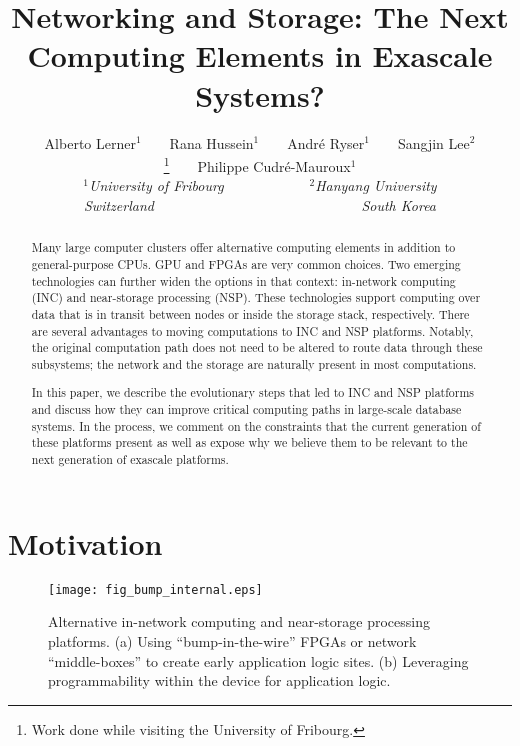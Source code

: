 \documentclass[11pt,dvipdfmx]{article}
\begin{document}
\title{Networking and Storage: The Next Computing Elements in Exascale Systems?}

\author{Alberto Lerner$^1$~~~~Rana Hussein$^1$~~~~Andr\'{e} Ryser$^1$~~~~Sangjin Lee$^2$\thanks{Work done while visiting the University of Fribourg.}~~~~Philippe Cudr\'{e}-Mauroux$^1$  \vspace{0.4em} \\$^1$\emph{University of Fribourg~~~~~~~~~~~~$^2$Hanyang University} \\ \emph{Switzerland~~~~~~~~~~~~~~~~~~~~~~~~~~~~~South Korea}}

\maketitle

\begin{abstract}
Many large computer clusters offer alternative computing elements in addition to
general-purpose CPUs.
GPU and FPGAs are very common choices.
Two emerging technologies can further widen the options in that context: in-network
computing (INC) and near-storage processing (NSP).
These technologies support computing over data that is in transit between nodes
or inside the storage stack, respectively.
There are several advantages to moving computations to INC and NSP platforms.
Notably, the original computation path does not need to be altered to
route data through these subsystems; the network and the storage are naturally
present in most computations.


In this paper, we describe the evolutionary steps that led to INC and NSP platforms
and discuss how they can improve critical computing paths in large-scale
database systems.
In the process, we comment on the constraints that the current generation of
these platforms present as well as expose why we believe them to be relevant
to the next generation of exascale platforms.
\end{abstract}


\section{Motivation}
\label{sec:motivation}

\begin{figure}[t]
    \centering
    \texttt{[image: fig\_bump\_internal.eps]} %
    \caption{Alternative in-network computing and near-storage processing
      platforms.
      (a) Using ``bump-in-the-wire'' FPGAs or network ``middle-boxes'' to create
      early application logic sites.
      (b) Leveraging programmability within the device for application logic.}
    \label{fig:bump_internal}
\end{figure}
\end{document}
